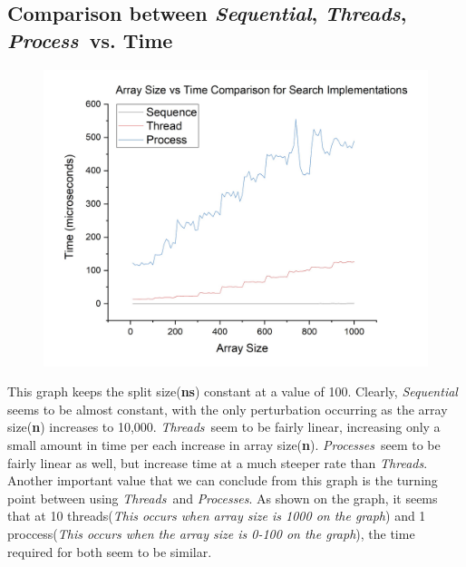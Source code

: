 \documentclass{article}
\begin{document}
            \subsection*{Comparison between \textit{Sequential}, \color{red}\textit{Threads}\color{black}, \color{blue}\textit{Process}\color{black}\ vs. Time}
                \begin{figure}[H]
                    \centering
                    \includegraphics[width=19cm]{svt-comparison-n100}
                \end{figure}
                This graph keeps the split size(\textbf{ns}) constant at a value of 100. 
                Clearly, \textit{Sequential} seems to be almost constant, with the only perturbation occurring as the array size(\textbf{n}) increases to 10,000.
                \color{red}\textit{Threads}\color{black}\ seem to be fairly linear, increasing only a small amount in time per each increase in array size(\textbf{n}).
                \color{blue}\textit{Processes}\color{black}\ seem to be fairly linear as well, but increase time at a much steeper rate than \color{red}\textit{Threads}\color{black}. \newline
                Another important value that we can conclude from this graph is the turning point between using \color{red}\textit{Threads}\color{black}\ and \color{blue}\textit{Processes}\color{black}.
                As shown on the graph, it seems that at 10 threads(\textit{This occurs when array size is 1000 on the graph}) and 1 proccess(\textit{This occurs when the array size is 0-100 on the graph}), the time required for both seem to be similar.
        \pagebreak
\end{document}
